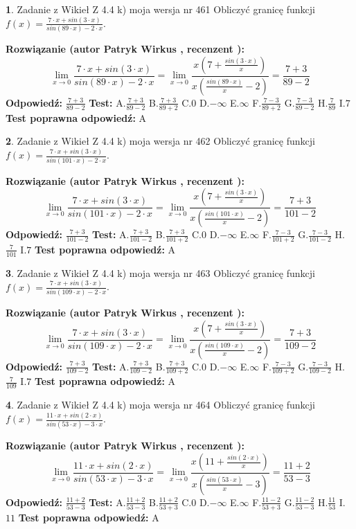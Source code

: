 \documentclass[12pt, a4paper]{article}
\theoremstyle{definition} %
\newtheorem{zad}{}
\newcommand{\zadStart}[1]{\begin{zad}#1\newline}
\newcommand{\zadStop}{\end{zad}}
\newcommand{\rozwStart}[2]{\noindent \textbf{Rozwiązanie (autor #1 , recenzent #2): }\newline}
\newcommand{\rozwStop}{\newline}
\newcommand{\odpStart}{\noindent \textbf{Odpowiedź:}\newline}
\newcommand{\odpStop}{\newline}
\newcommand{\testStart}{\noindent \textbf{Test:}\newline}
\newcommand{\testStop}{\newline}
\newcommand{\kluczStart}{\noindent \textbf{Test poprawna odpowiedź:}\newline}
\newcommand{\kluczStop}{\newline}
\begin{document}
\zadStart{Zadanie z Wikieł Z 4.4 k) moja wersja nr 461}
Obliczyć granicę funkcji $f(x)=\frac{7\cdot x +sin(3\cdot x)}{sin(89\cdot x) -2\cdot x}$.
\zadStop
\rozwStart{Patryk Wirkus}{}
$$\lim\limits_{x\to 0}\frac{7\cdot x +sin(3\cdot x)}{sin(89\cdot x) -2\cdot x}
=\lim\limits_{x\to 0}\frac{x(7+\frac{sin(3\cdot x)}{x})}{x(\frac{sin(89\cdot x)}{x}-2)}
=\frac{7+3}{89-2}$$
\rozwStop
\odpStart
$\frac{7+3}{89-2}$
\odpStop
\testStart
A.$\frac{7+3}{89-2}$
B.$\frac{7+3}{89+2}$
C.$0$
D.$-\infty$
E.$\infty$
F.$\frac{7-3}{89+2}$
G.$\frac{7-3}{89-2}$
H.$\frac{7}{89}$
I.$7$
\testStop
\kluczStart
A
\kluczStop



\zadStart{Zadanie z Wikieł Z 4.4 k) moja wersja nr 462}
Obliczyć granicę funkcji $f(x)=\frac{7\cdot x +sin(3\cdot x)}{sin(101\cdot x) -2\cdot x}$.
\zadStop
\rozwStart{Patryk Wirkus}{}
$$\lim\limits_{x\to 0}\frac{7\cdot x +sin(3\cdot x)}{sin(101\cdot x) -2\cdot x}
=\lim\limits_{x\to 0}\frac{x(7+\frac{sin(3\cdot x)}{x})}{x(\frac{sin(101\cdot x)}{x}-2)}
=\frac{7+3}{101-2}$$
\rozwStop
\odpStart
$\frac{7+3}{101-2}$
\odpStop
\testStart
A.$\frac{7+3}{101-2}$
B.$\frac{7+3}{101+2}$
C.$0$
D.$-\infty$
E.$\infty$
F.$\frac{7-3}{101+2}$
G.$\frac{7-3}{101-2}$
H.$\frac{7}{101}$
I.$7$
\testStop
\kluczStart
A
\kluczStop



\zadStart{Zadanie z Wikieł Z 4.4 k) moja wersja nr 463}
Obliczyć granicę funkcji $f(x)=\frac{7\cdot x +sin(3\cdot x)}{sin(109\cdot x) -2\cdot x}$.
\zadStop
\rozwStart{Patryk Wirkus}{}
$$\lim\limits_{x\to 0}\frac{7\cdot x +sin(3\cdot x)}{sin(109\cdot x) -2\cdot x}
=\lim\limits_{x\to 0}\frac{x(7+\frac{sin(3\cdot x)}{x})}{x(\frac{sin(109\cdot x)}{x}-2)}
=\frac{7+3}{109-2}$$
\rozwStop
\odpStart
$\frac{7+3}{109-2}$
\odpStop
\testStart
A.$\frac{7+3}{109-2}$
B.$\frac{7+3}{109+2}$
C.$0$
D.$-\infty$
E.$\infty$
F.$\frac{7-3}{109+2}$
G.$\frac{7-3}{109-2}$
H.$\frac{7}{109}$
I.$7$
\testStop
\kluczStart
A
\kluczStop



\zadStart{Zadanie z Wikieł Z 4.4 k) moja wersja nr 464}
Obliczyć granicę funkcji $f(x)=\frac{11\cdot x +sin(2\cdot x)}{sin(53\cdot x) -3\cdot x}$.
\zadStop
\rozwStart{Patryk Wirkus}{}
$$\lim\limits_{x\to 0}\frac{11\cdot x +sin(2\cdot x)}{sin(53\cdot x) -3\cdot x}
=\lim\limits_{x\to 0}\frac{x(11+\frac{sin(2\cdot x)}{x})}{x(\frac{sin(53\cdot x)}{x}-3)}
=\frac{11+2}{53-3}$$
\rozwStop
\odpStart
$\frac{11+2}{53-3}$
\odpStop
\testStart
A.$\frac{11+2}{53-3}$
B.$\frac{11+2}{53+3}$
C.$0$
D.$-\infty$
E.$\infty$
F.$\frac{11-2}{53+3}$
G.$\frac{11-2}{53-3}$
H.$\frac{11}{53}$
I.$11$
\testStop
\kluczStart
A
\kluczStop
\end{document}

